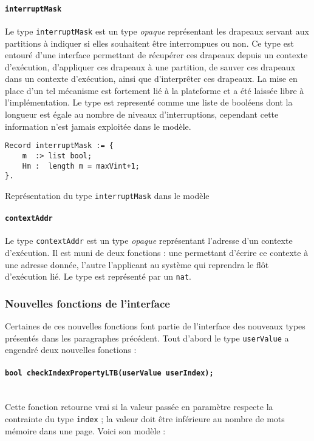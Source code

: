		\paragraph{\texttt{interruptMask}} Le type \texttt{interruptMask} est un type \emph{opaque} représentant les drapeaux servant aux partitions à indiquer si elles souhaitent être interrompues ou non. Ce type est entouré d'une interface permettant de récupérer ces drapeaux depuis un contexte d'exécution, d'appliquer ces drapeaux à une partition, de sauver ces drapeaux dans un contexte d'exécution, ainsi que d'interprêter ces drapeaux. La mise en place d'un tel mécanisme est fortement lié à la plateforme et a été laissée libre à l'implémentation. Le type est representé comme une liste de booléens dont la longueur est égale au nombre de niveaux d'interruptions, cependant cette information n'est jamais exploitée dans le modèle.
		\begin{listing}[!ht]
			\begin{verbatim}
Record interruptMask := {
    m  :> list bool;
    Hm :  length m = maxVint+1;
}.
			\end{verbatim}
			\caption{Représentation du type \texttt{interruptMask} dans le modèle}
		\end{listing}

		\paragraph{\texttt{contextAddr}} Le type \texttt{contextAddr} est un type \emph{opaque} représentant l'adresse d'un contexte d'exécution. Il est muni de deux fonctions : une permettant d'écrire ce contexte à une adresse donnée, l'autre l'applicant au système qui reprendra le flôt d'exécution lié. Le type est représenté par un \texttt{nat}.


		\subsubsection{Nouvelles fonctions de l'interface}

		Certaines de ces nouvelles fonctions font partie de l'interface des nouveaux types présentés dans les paragraphes précédent. Tout d'abord le type \texttt{userValue} a engendré deux nouvelles fonctions :
		\paragraph{\texttt{bool checkIndexPropertyLTB(userValue userIndex);}}~\\
		Cette fonction retourne vrai si la valeur passée en paramètre respecte la contrainte du type \texttt{index} ; la valeur doit être inférieure au nombre de mots mémoire dans une page. Voici son modèle :


